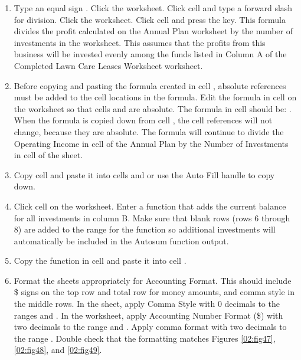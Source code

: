 \begin{enumerate}
	\item Type an equal sign \fmtTyping{=}. Click the  worksheet. Click cell  and type a forward slash \fmtTyping{/} for division. Click the  worksheet. Click cell  and press the  key. This formula divides the profit calculated on the Annual Plan worksheet by the number of investments in the  worksheet. This assumes that the profits from this business will be invested evenly among the funds listed in Column A of the Completed Lawn Care Leases Worksheet worksheet.
	
	\item Before copying and pasting the formula created in cell , absolute references must be added to the cell locations in the formula. Edit the formula in cell  on the  worksheet so that cells  and  are absolute. The formula in cell  should be: . When the formula is copied down from cell , the cell references will not change, because they are absolute. The formula will continue to divide the Operating Income in cell  of the Annual Plan by the Number of Investments in cell  of the  sheet.
	
	\item Copy cell  and paste it into cells  and  or use the Auto Fill handle to copy down.
	
	\item Click cell  on the  worksheet. Enter a  function that adds the current balance for all investments in column B. Make sure that blank rows (rows 6 through 8) are added to the range for the function so additional investments will automatically be included in the Autosum function output.
	
	\item Copy the  function in cell  and paste it into cell .
	
	\item Format the  sheets appropriately for Accounting Format. This should include \$ signs on the top row and total row for money amounts, and comma style in the middle rows. In the  sheet, apply Comma Style with $ 0 $ decimals to the ranges  and . In the  worksheet, apply Accounting Number Format (\$) with two decimals to the range  and . Apply comma format with two decimals to the range . Double check that the formatting matches Figures \ref{02:fig47}, \ref{02:fig48}, and \ref{02:fig49}.
	

\end{enumerate}
